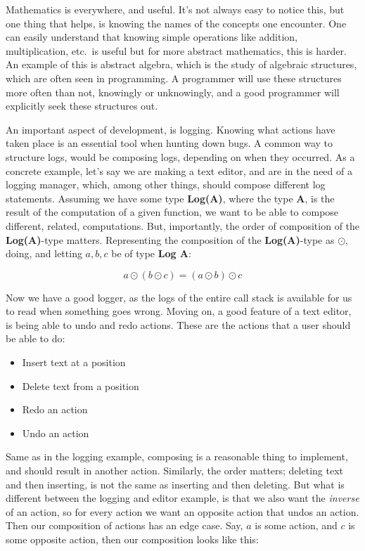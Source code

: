 Mathematics is everywhere, and useful. It's not always easy to notice this, but
one thing that helps, is knowing the names of the concepts one encounter. One
can easily understand that knowing simple operations like addition,
multiplication, etc.\ is useful but for more abstract mathematics, this is
harder. An example of this is abstract algebra, which is the study of algebraic
structures, which are often seen in programming. A programmer will use these
structures more often than not, knowingly or unknowingly, and a good programmer
will explicitly seek these structures out.

An important aspect of development, is logging. Knowing what actions have taken
place is an essential tool when hunting down bugs. A common way to structure
logs, would be composing logs, depending on when they occurred. As a concrete
example, let's say we are making a text editor, and are in the need of a logging
manager, which, among other things, should compose different log statements.
Assuming we have some type \textbf{Log(A)}, where the type \textbf{A}, is the
result of the computation of a given function, we want to be able to compose
different, related, computations. But, importantly, the order of composition
of the \textbf{Log(A)}-type matters. Representing the composition of the
\textbf{Log(A)}-type as $\odot$, doing, and letting $a, b, c$ be of type
\textbf{Log A}:

\begin{definition} \label{def:logComp}
  \begin{equation}
    a \odot \left ( b \odot c \right ) = \left ( a \odot b \right ) \odot c
  \end{equation}
\end{definition}

Now we have a good logger, as the logs of the entire call stack is available for
us to read when something goes wrong. Moving on, a good feature of a text
editor, is being able to undo and redo actions. These are the actions that a
user should be able to do:

\begin{itemize}
  \item Insert text at a position
  \item Delete text from a position
  \item Redo an action
  \item Undo an action
\end{itemize}

Same as in the logging example, composing is a reasonable thing to implement,
and should result in another action. Similarly, the order matters; deleting text
and then inserting, is not the same as inserting and then deleting. But what is
different between the logging and editor example, is that we also want the
\textit{inverse} of an action, so for every action we want an opposite action
that undos an action. Then our composition of actions has an edge case. Say, $a$
is some action, and $c$ is some opposite action, then our composition looks like
this:

